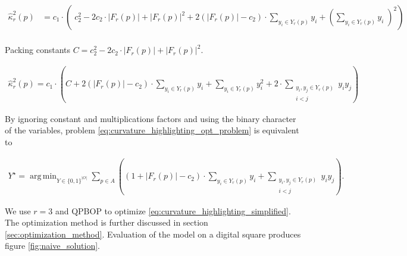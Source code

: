 \documentclass[runningheads]{llncs}
\DeclareMathOperator*{\argmin}{arg\,min}
\begin{document}
	\begin{align*}
		\hat{\kappa}_{r}^2(p) &= c_1 \cdot \left( \; c_2^2 - 2c_2 \cdot |F_r(p)| + |F_r(p)|^2 + 2\left( |F_r(p)| - c_2 \right) \cdot \sum_{y_i \in Y_r(p)}{y_i}  + \left( \sum_{y_i \in Y_r(p)}{y_i} \; \right) ^2 \right) \\[1em]
	\end{align*}
	
	Packing constants $C=c_2^2 - 2c_2 \cdot |F_r(p)| + |F_r(p)|^2$.
	
	\begin{align*}
		\hat{\kappa}_{r}^2(p) = c_1 \cdot \left( C + 2\left( |F_r(p)| - c_2 \right) \cdot \sum_{y_i \in Y_r(p)}{y_i} + \sum_{y_i \in Y_r(p)}{y_i^2} + 2 \cdot \sum_{ \substack{y_i,y_j \in Y_r(p) \\ i<j} }{y_iy_j}  \right)
	\end{align*}
	
	By ignoring constant and multiplications factors and using the binary character of the variables, problem \eqref{eq:curvature_highlighting_opt_problem} is equivalent to

	
\begin{align}			
	Y^{\star} = \argmin_{Y \in \{0,1\}^{|O|}} \sum_{p \in A}{ \left( { (1+ |F_r(p)|-c_2) \cdot \sum_{y_i \in Y_r(p)}{y_i} } + \sum_{ \substack{y_i,y_j \in Y_r(p) \\ i<j} }{y_iy_j} \right) }.
	\label{eq:curvature_highlighting_simplified}
\end{align}

We use $r=3$ and QPBOP to optimize \eqref{eq:curvature_highlighting_simplified}. The optimization method is further discussed in section \ref{sec:optimization_method}. Evaluation of the model on a digital square produces figure \ref{fig:naive_solution}.
\end{document}
